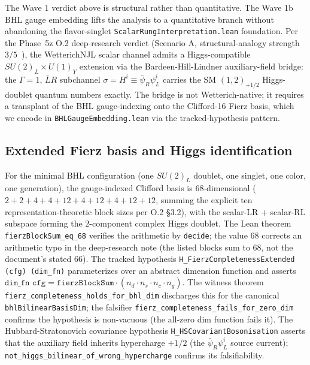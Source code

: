 \documentclass[aps,prd,twocolumn,showpacs,superscriptaddress,nofootinbib]{revtex4-2}
\begin{document}
The Wave 1 verdict above is structural rather than quantitative. The
Wave 1b BHL gauge embedding lifts the analysis to a quantitative branch
without abandoning the flavor-singlet
\texttt{ScalarRungInterpretation.lean} foundation. Per the
Phase~5z O.2 deep-research verdict (Scenario A, structural-analogy strength
$3/5$~\cite{BardeenHillLindner,MiranskyTanabashiYamawaki1989,Hill2025Redux,Cvetic1999}),
the WetterichNJL scalar channel admits a Higgs-compatible
$SU(2)_L \times U(1)_Y$ extension via the Bardeen-Hill-Lindner
auxiliary-field bridge: the $\Gamma=1$, $\bar L R$ subchannel
$\sigma = H^i \equiv \bar\psi_R \psi_L^i$ carries the SM
$(1,2)_{+1/2}$ Higgs-doublet quantum numbers exactly. The bridge is not
Wetterich-native; it requires a transplant of the BHL gauge-indexing
onto the Clifford-16 Fierz basis, which we encode in
\texttt{BHLGaugeEmbedding.lean} via the tracked-hypothesis pattern.

\subsection{Extended Fierz basis and Higgs identification}

For the minimal BHL configuration (one $SU(2)_L$ doublet, one singlet,
one color, one generation), the gauge-indexed Clifford basis is
$68$-dimensional ($2 + 2 + 4 + 4 + 12 + 4 + 12 + 4 + 12 + 12$, summing
the explicit ten representation-theoretic block sizes per O.2 §3.2),
with the scalar-LR + scalar-RL subspace forming the $2$-component
complex Higgs doublet. The Lean theorem \texttt{fierzBlockSum\_eq\_68}
verifies the arithmetic by \texttt{decide}; the value $68$ corrects an
arithmetic typo in the deep-research note (the listed blocks sum to
$68$, not the document's stated $66$). The tracked hypothesis
\texttt{H\_FierzCompletenessExtended (cfg) (dim\_fn)} parameterizes
over an abstract dimension function and asserts
$\texttt{dim\_fn cfg} = \texttt{fierzBlockSum} \cdot (n_d \cdot n_s
\cdot n_c \cdot n_g)$. The witness theorem
\texttt{fierz\_completeness\_holds\_for\_bhl\_dim} discharges this for
the canonical \texttt{bhlBilinearBasisDim}; the falsifier
\texttt{fierz\_completeness\_fails\_for\_zero\_dim} confirms the
hypothesis is non-vacuous (the all-zero dim function fails it).
The Hubbard-Stratonovich covariance hypothesis
\texttt{H\_HSCovariantBosonisation} asserts that the auxiliary field
inherits hypercharge $+1/2$ (the $\bar\psi_R \psi_L^i$ source current);
\texttt{not\_higgs\_bilinear\_of\_wrong\_hypercharge} confirms its
falsifiability.
\end{document}
